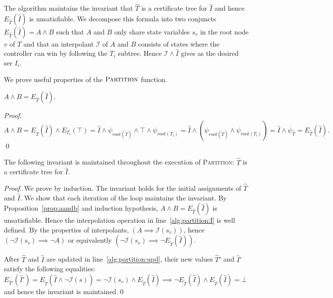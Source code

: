 The algorithm maintains the invariant that $\hat{T}$ is a
certificate tree for $\hat{I}$ and hence $E_{\hat{T}}(\hat{I})$ is
unsatisfiable.  We decompose this formula into two conjuncts
$E_{\hat{T}}(\hat{I}) =A \land B$ such that $A$ and $B$ only share
state variables $s_v$ in the root node $v$ of $T$ and that an
interpolant $\mathcal{I}$ of $A$ and $B$ consists of states where
the controller can win by following the $T_i$ subtree.  Hence
$\mathcal{I}\land \hat{I}$ gives as the desired ser $I_i$.


We prove useful properties of the $\textsc{Partition}$ function.
\begin{proposition}\label{prop:aandb}
    $A\land B = E_{\hat{T}}(\hat{I})$.
\end{proposition}
\begin{proof}
$A\land B = E_{\tilde{T}}(\hat{I}) \land E_{T_i}(\top) =
\hat{I} \land \psi_{root(\tilde{T})} \land \top \land \psi_{root(T_i)} =
\hat{I} \land (\psi_{root(\tilde{T})} \land \psi_{root(T_i)}) =
\hat{I} \land \psi_{\hat{T}} = E_{\hat{T}}(\hat{I}).$
\qed
\end{proof}

\begin{proposition}
    The following invariant is maintained throughout the execution of
    \textsc{Partition}: $\hat{T}$ is a certificate tree for $\hat{I}$.
\end{proposition}
\begin{proof}
We prove by induction.  The invariant holds for the initial
assignments of $\hat{T}$ and $\hat{I}$.  We show that each
iteration of the loop maintains the invariant.  By
Proposition~\ref{prop:aandb} and induction hypothesis, $A\land B =
E_{\hat{T}}(\hat{I})$ is unsatisfiable.  Hence the interpolation
operation in line~\ref{alg:partition:I} is well defined.  By the
properties of interpolants, $(A\implies\mathcal{I}(s_v))$, hence
$(\neg\mathcal{I}(s_v) \implies \neg A)$ or equivalently
$(\neg\mathcal{I}(s_v) \implies \neg E_{\tilde{T}}(\hat{I}))$.

After $\hat{T}$ and $\hat{I}$ are updated in
line~\ref{alg:partition:upd}, their new values $\hat{T}'$ and
$\hat{I}'$ satisfy the following equalities:
$E_{\hat{T}'}(\hat{I}') = E_{\tilde{T}}(\hat{I} \land
\neg\mathcal{I}(s)) = \neg\mathcal{I}(s_v) \land
E_{\tilde{T}}(\hat{I}) \implies \neg E_{\tilde{T}}(\hat{I}) \land
E_{\tilde{T}}(\hat{I}) = \bot$ and hence the invariant is
maintained.\qed
\end{proof}

